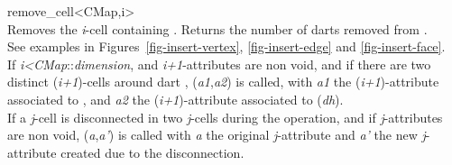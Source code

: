 \begin{ccRefFunction}{remove_cell<CMap,i>}
\\

{Removes the \emph{i}-cell containing . 
  Returns the number of darts removed from .
 \\
  See examples in Figures~\ref{fig-insert-vertex}, \ref{fig-insert-edge} and \ref{fig-insert-face}.  \\
%
   If \emph{i<CMap}::\emph{dimension}, and \emph{i+1}-attributes are
   non void, and if there are two distinct (\emph{i+1})-cells around dart
   , (\emph{a1},\emph{a2}) is
   called, with \emph{a1} the (\emph{i+1})-attribute associated to ,
   and \emph{a2} the (\emph{i+1})-attribute associated to \betaipun{}(\emph{dh}).\\
   If a \emph{j}-cell is disconnected in two \emph{j}-cells during the
   operation, and if \emph{j}-attributes are non void,
   (\emph{a},\emph{a'}) is called 
   with \emph{a} the original \emph{j}-attribute and \emph{a'} the new 
   \emph{j}-attribute created due to the disconnection.
}



\end{ccRefFunction}
